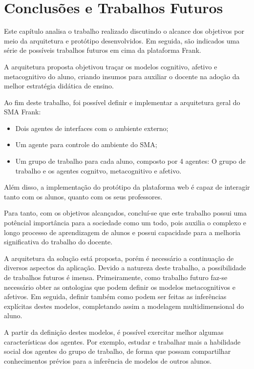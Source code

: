 \chapter{Conclusões e Trabalhos Futuros}
Este capítulo analisa o trabalho realizado discutindo o alcance dos objetivos por meio da arquitetura e protótipo desenvolvidos. Em seguida, são indicados uma série de possíveis trabalhos futuros em cima da plataforma Frank.

A arquitetura proposta objetivou traçar os modelos cognitivo, afetivo e metacognitivo do aluno, criando insumos para auxiliar o docente na adoção da melhor estratégia didática de ensino.

Ao fim deste trabalho, foi possível definir e implementar a arquitetura geral do SMA Frank:
\begin{itemize}
 	\item Dois agentes de interfaces com o ambiente externo;
	\item Um agente para controle do ambiente do SMA;
	\item Um grupo de trabalho para cada aluno, composto por 4 agentes: O grupo de trabalho e os agentes cognitvo, metacognitivo e afetivo.
\end{itemize}

Além disso, a implementação do protótipo da plataforma web é capaz de interagir tanto com os alunos, quanto com os seus professores.

Para tanto, com os objetivos alcançados, concluí-se que este trabalho possui uma potêncial importância para a sociedade como um todo, pois auxilia o complexo e longo processo de aprendizagem de alunos e possui capacidade para a melhoria significativa do trabalho do docente.

A arquitetura da solução está proposta, porém é necessário a continuação de diversos aspectos da aplicação. Devido a natureza deste trabalho, a possibilidade de trabalhos futuros é imensa. Primeiramente, como trabalho futuro faz-se necessário obter as ontologias que podem definir os modelos metacognitivos e afetivos. Em seguida, definir também como podem ser feitas as inferências explícitas destes modelos, completando assim a modelagem multidimensional do aluno.

A partir da definição destes modelos, é possível exercitar melhor algumas características dos agentes. Por exemplo, estudar e trabalhar mais a habilidade social dos agentes do grupo de trabalho, de forma que possam compartilhar conhecimentos prévios para a inferência de modelos de outros alunos.

